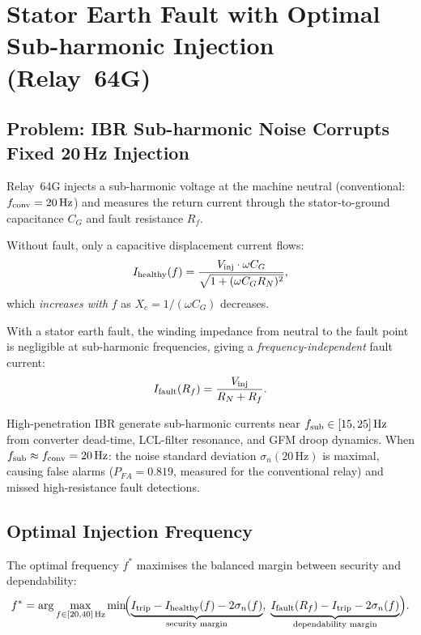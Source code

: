 \section{Stator Earth Fault with Optimal Sub-harmonic Injection (Relay~64G)}
\label{sec:ch6_relay64g}

\subsection{Problem: IBR Sub-harmonic Noise Corrupts Fixed 20\,Hz Injection}
\label{sec:ch6_64g_problem}

Relay~64G injects a sub-harmonic voltage at the machine neutral (conventional:
$f_{\rm conv} = 20\,\text{Hz}$) and measures the return current through the
stator-to-ground capacitance $C_G$ and fault resistance $R_f$.

Without fault, only a capacitive displacement current flows:
\begin{equation}
  I_{\rm healthy}(f) = \frac{V_{\rm inj} \cdot \omega C_G}{\sqrt{1 + (\omega C_G R_N)^2}},
  \label{eq:ch6_Ihealthy}
\end{equation}
which \emph{increases with} $f$ as $X_c = 1/(\omega C_G)$ decreases.

With a stator earth fault, the winding impedance from neutral to the fault point
is negligible at sub-harmonic frequencies, giving a \emph{frequency-independent}
fault current:
\begin{equation}
  I_{\rm fault}(R_f) = \frac{V_{\rm inj}}{R_N + R_f}.
  \label{eq:ch6_Ifault}
\end{equation}

High-penetration IBR generate sub-harmonic currents near
$f_{\rm sub} \in [15, 25]\,\text{Hz}$ from converter dead-time, LCL-filter
resonance, and GFM droop dynamics.  When $f_{\rm sub} \approx f_{\rm conv} = 20\,\text{Hz}$:
the noise standard deviation $\sigma_n(20\,\text{Hz})$ is maximal,
causing false alarms ($P_{FA} = 0.819$, measured for the conventional relay)
and missed high-resistance fault detections.

\subsection{Optimal Injection Frequency}
\label{sec:ch6_64g_fopt}

The optimal frequency $f^*$ maximises the balanced margin between security
and dependability:
\begin{equation}
  f^* = \arg\max_{f \in [20,40]\,\text{Hz}}
  \min\!\Bigl(
    \underbrace{I_{\rm trip} - I_{\rm healthy}(f) - 2\sigma_n(f)}_{\text{security margin}},\;
    \underbrace{I_{\rm fault}(R_f) - I_{\rm trip} - 2\sigma_n(f)}_{\text{dependability margin}}
  \Bigr).
  \label{eq:ch6_fopt}
\end{equation}

